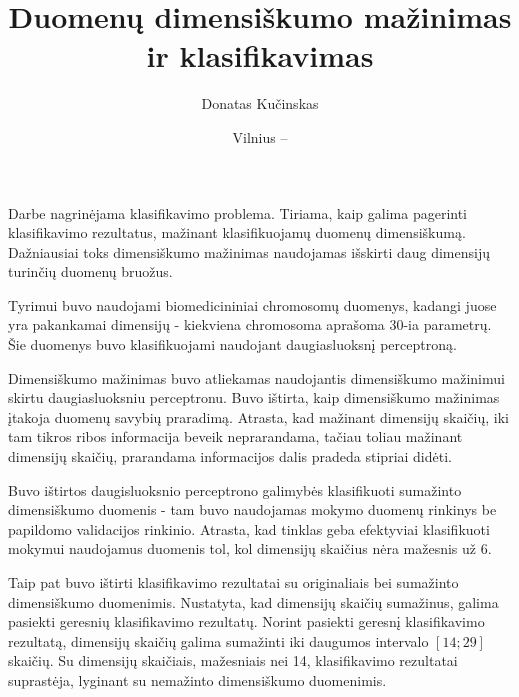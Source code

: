 \documentclass{VUMIFPSbakalaurinis}
\title{Duomenų dimensiškumo mažinimas ir klasifikavimas}
\author{Donatas Kučinskas}
\date{Vilnius – \the\year}
\begin{document}
\maketitle

\setcounter{page}{2}








Darbe nagrinėjama klasifikavimo problema.
Tiriama, kaip galima pagerinti klasifikavimo rezultatus, mažinant klasifikuojamų duomenų dimensiškumą.
Dažniausiai toks dimensiškumo mažinimas naudojamas išskirti daug dimensijų turinčių duomenų bruožus.

Tyrimui buvo naudojami biomedicininiai chromosomų duomenys, kadangi juose yra pakankamai dimensijų - kiekviena chromosoma aprašoma 30-ia parametrų.
Šie duomenys buvo klasifikuojami naudojant daugiasluoksnį perceptroną.

Dimensiškumo mažinimas buvo atliekamas naudojantis dimensiškumo mažinimui skirtu daugiasluoksniu perceptronu.
Buvo ištirta, kaip dimensiškumo mažinimas įtakoja duomenų savybių praradimą.
Atrasta, kad mažinant dimensijų skaičių, iki tam tikros ribos informacija beveik neprarandama, tačiau toliau mažinant dimensijų skaičių, prarandama informacijos dalis pradeda stipriai didėti.

Buvo ištirtos daugisluoksnio perceptrono galimybės klasifikuoti sumažinto dimensiškumo duomenis - tam buvo naudojamas mokymo duomenų rinkinys be papildomo validacijos rinkinio.
Atrasta, kad tinklas geba efektyviai klasifikuoti mokymui naudojamus duomenis tol, kol dimensijų skaičius nėra mažesnis už 6.

Taip pat buvo ištirti klasifikavimo rezultatai su originaliais bei sumažinto dimensiškumo duomenimis.
Nustatyta, kad dimensijų skaičių sumažinus, galima pasiekti geresnių klasifikavimo rezultatų.
Norint pasiekti geresnį klasifikavimo rezultatą, dimensijų skaičių galima sumažinti iki daugumos intervalo $[14; 29]$ skaičių.
Su dimensijų skaičiais, mažesniais nei 14, klasifikavimo rezultatai suprastėja, lyginant su nemažinto dimensiškumo duomenimis.
\end{document}

